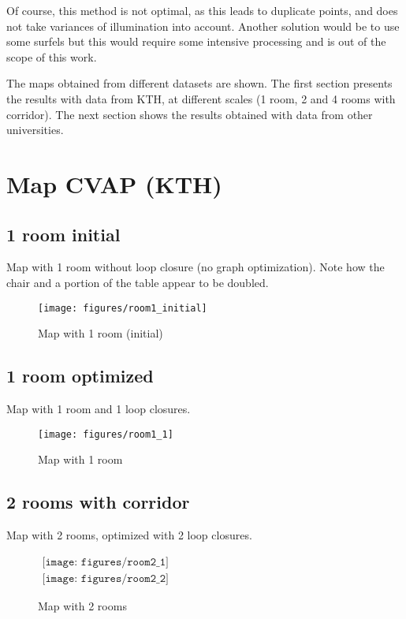 Of course, this method is not optimal, as this leads to duplicate points, and does not take variances of illumination into account. Another solution would be to use some surfels \cite{Intel_RGBD_2010} but this would require some intensive processing and is out of the scope of this work.

The maps obtained from different datasets are shown. The first section presents the results with data from KTH, at different scales (1 room, 2 and 4 rooms with corridor). The next section shows the results obtained with data from other universities.

\section{Map CVAP (KTH)}

\subsection{1 room initial}
Map with 1 room without loop closure (no graph optimization). Note how the chair and a portion of the table appear to be doubled.

\begin{figure}[h!]
\centering
\texttt{[image: figures/room1\_initial]}
\caption{Map with 1 room (initial)}
\end{figure}

\subsection{1 room optimized}
Map with 1 room and 1 loop closures.

\begin{figure}[h!]
\centering
\texttt{[image: figures/room1\_1]}
\caption{Map with 1 room}
\end{figure}

\clearpage

\subsection{2 rooms with corridor}
Map with 2 rooms, optimized with 2 loop closures.

\begin{figure}[h!]
\centering$
\begin{array}{c}
\texttt{[image: figures/room2\_1]}\\
\texttt{[image: figures/room2\_2]}
\end{array}$
\caption{Map with 2 rooms}
\end{figure}

